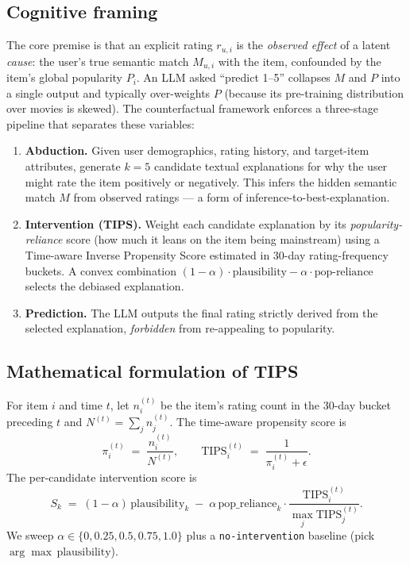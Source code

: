 \documentclass[11pt,a4paper]{article}
\begin{document}
\subsection{Cognitive framing}
The core premise is that an explicit rating $r_{u,i}$ is the
\emph{observed effect} of a latent \emph{cause}: the user's true semantic
match $M_{u,i}$ with the item, confounded by the item's global popularity
$P_i$. An LLM asked ``predict 1--5'' collapses $M$ and $P$ into a single
output and typically over-weights $P$ (because its pre-training distribution
over movies is skewed). The counterfactual framework enforces a
three-stage pipeline that separates these variables:
\begin{enumerate}[leftmargin=1.5em,itemsep=1pt]
\item[\textbf{A.}]\textbf{Abduction.}
  Given user demographics, rating history, and target-item attributes,
  generate $k{=}5$ candidate textual explanations for why the user might
  rate the item positively or negatively. This infers the hidden semantic
  match $M$ from observed ratings --- a form of inference-to-best-explanation.
\item[\textbf{I.}]\textbf{Intervention (TIPS).}
  Weight each candidate explanation by its \emph{popularity-reliance}
  score (how much it leans on the item being mainstream) using a
  Time-aware Inverse Propensity Score estimated in 30-day rating-frequency
  buckets. A convex combination $(1-\alpha)\cdot\text{plausibility} -
  \alpha\cdot\text{pop-reliance}$ selects the debiased explanation.
\item[\textbf{P.}]\textbf{Prediction.}
  The LLM outputs the final rating strictly derived from the selected
  explanation, \emph{forbidden} from re-appealing to popularity.
\end{enumerate}

\subsection{Mathematical formulation of TIPS}
For item $i$ and time $t$, let $n_i^{(t)}$ be the item's rating count in
the 30-day bucket preceding $t$ and $N^{(t)} = \sum_j n_j^{(t)}$. The
time-aware propensity score is
\[
  \pi_i^{(t)} \;=\; \frac{n_i^{(t)}}{N^{(t)}},
  \qquad
  \text{TIPS}_i^{(t)} \;=\; \frac{1}{\pi_i^{(t)} + \epsilon}.
\]
The per-candidate intervention score is
\[
  S_k \;=\; (1-\alpha)\,\text{plausibility}_k \;-\;
            \alpha\,\text{pop\_reliance}_k \cdot
            \frac{\text{TIPS}_i^{(t)}}{\max_j \text{TIPS}_j^{(t)}}.
\]
We sweep $\alpha \in \{0, 0.25, 0.5, 0.75, 1.0\}$ plus a
\texttt{no-intervention} baseline (pick $\arg\max\,\text{plausibility}$).
\end{document}
